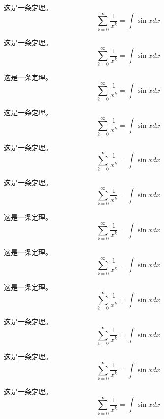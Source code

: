 \documentclass[twoside]{fduthesis}
\begin{document}
\begin{mm}[明早]
这是一条定理。
\[ \sum_{k=0}^{\infty} \frac{1}{x^k} = \int \sin x dx \]
\end{mm}

\begin{fduc}
这是一条定理。
\[ \sum_{k=0}^{\infty} \frac{1}{x^k} = \int \sin x dx \]
\end{fduc}

\begin{fdub}
这是一条定理。
\[ \sum_{k=0}^{\infty} \frac{1}{x^k} = \int \sin x dx \]
\end{fdub}

\begin{mb}
这是一条定理。
\[ \sum_{k=0}^{\infty} \frac{1}{x^k} = \int \sin x dx \]
\end{mb}

\begin{cb}
这是一条定理。
\[ \sum_{k=0}^{\infty} \frac{1}{x^k} = \int \sin x dx \]
\end{cb}


\begin{np}
这是一条定理。
\[ \sum_{k=0}^{\infty} \frac{1}{x^k} = \int \sin x dx \]
\end{np}

\begin{nmm}[明天一早]
这是一条定理。
\[ \sum_{k=0}^{\infty} \frac{1}{x^k} = \int \sin x dx \]
\end{nmm}

\begin{nfduc}
这是一条定理。
\[ \sum_{k=0}^{\infty} \frac{1}{x^k} = \int \sin x dx \]
\end{nfduc}

\begin{nfdub}
这是一条定理。
\[ \sum_{k=0}^{\infty} \frac{1}{x^k} = \int \sin x dx \]
\end{nfdub}

\begin{nmb}
这是一条定理。
\[ \sum_{k=0}^{\infty} \frac{1}{x^k} = \int \sin x dx \]
\end{nmb}

\begin{ncb}
这是一条定理。
\[ \sum_{k=0}^{\infty} \frac{1}{x^k} = \int \sin x dx \]
\end{ncb}

\begin{ncb}
这是一条定理。
\[ \sum_{k=0}^{\infty} \frac{1}{x^k} = \int \sin x dx \]
\end{ncb}
\end{document}
